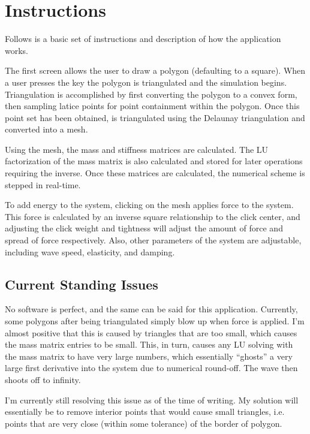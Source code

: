 \section{Instructions}
Follows is a basic set of instructions and description of how the application works.

The first screen allows the user to draw a polygon (defaulting to a square). When a user presses the key the polygon is
triangulated and the simulation begins. Triangulation is accomplished by first converting the polygon to a convex form,
then sampling latice points for point containment within the polygon. Once this point set has been obtained, is
triangulated using the Delaunay triangulation and converted into a mesh.

Using the mesh, the mass and stiffness matrices are calculated. The LU factorization of the mass matrix is also
calculated and stored for later operations requiring the inverse. Once these matrices are calculated, the numerical
scheme is stepped in real-time.

To add energy to the system, clicking on the mesh applies force to the system. This force is calculated by an inverse
square relationship to the click center, and adjusting the click weight and tightness will adjust the amount of force
and spread of force respectively. Also, other parameters of the system are adjustable, including wave speed,
elasticity, and damping.

\subsection{Current Standing Issues}
No software is perfect, and the same can be said for this application. Currently, some polygons after being triangulated
simply blow up when force is applied. I'm almost positive that this is caused by triangles that are too small, which
causes the mass matrix entries to be small. This, in turn, causes any LU solving with the mass matrix to have very large
numbers, which essentially ``ghosts'' a very large first derivative into the system due to numerical round-off. The wave
then shoots off to infinity.

I'm currently still resolving this issue as of the time of writing. My solution will essentially be to remove interior
points that would cause small triangles, i.e. points that are very close (within some tolerance) of the border of
polygon.
